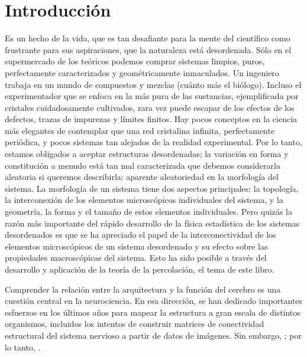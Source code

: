 \chapter{Introducción}


Es un hecho de la vida, que es tan desafiante para la mente del científico como frustrante para sus aspiraciones, que la naturaleza está desordenada. Sólo en el supermercado de los teóricos podemos comprar sistemas limpios, puros, perfectamente caracterizados y geométricamente inmaculados. Un ingeniero trabaja en un mundo de compuestos y mezclas (cuánto más el biólogo). Incluso el experimentador que se enfoca en la más pura de las sustancias, ejemplificada por cristales cuidadosamente cultivados, rara vez puede escapar de los efectos de los defectos, trazas de impurezas y límites finitos. Hay pocos conceptos en la ciencia más elegantes de contemplar que una red cristalina infinita, perfectamente periódica, y pocos sistemas tan alejados de la realidad experimental. Por lo tanto, estamos obligados a aceptar estructuras desordenadas; la variación en forma y constitución a menudo está tan mal caracterizada que debemos considerarla aleatoria si queremos describirla: aparente aleatoriedad en la morfología del sistema. La morfología de un sistema tiene dos aspectos principales: la topología, la interconexión de los elementos microscópicos individuales del sistema, y la geometría, la forma y el tamaño de estos elementos individuales. Pero quizás la razón más importante del rápido desarrollo de la física estadística de los sistemas desordenados es que se ha apreciado el papel de la interconectividad de los elementos microscópicos de un sistema desordenado y su efecto sobre las propiedades macroscópicas del sistema. Esto ha sido posible a través del desarrollo y aplicación de la teoría de la percolación, el tema de este libro.





Comprender la relación entre la arquitectura y la función del cerebro es una cuestión central en la neurociencia. En esa dirección, se han dedicado importantes esfuerzos en los últimos años para mapear la estructura a gran escala de distintos organismos, incluidos los intentos de construir matrices de conectividad estructural del sistema nervioso a partir de datos de imágenes.  Sin embargo,   ; por lo tanto,  \cite{sporns_discovering_2012}.


